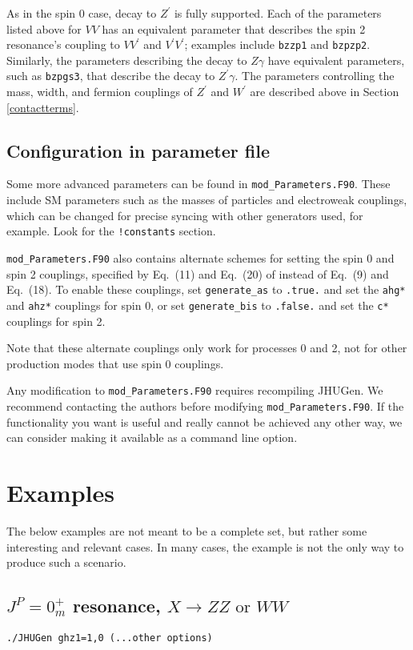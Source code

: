\documentclass[aps,superscriptaddress,nofootinbib]{revtex4}
\begin{document}
As in the spin 0 case, decay to $Z^\prime$ is fully supported.  Each of the parameters listed above for $VV$ has an equivalent parameter that describes the spin 2 resonance's coupling to $VV^\prime$ and $V^\prime V^\prime$; examples include \verb|bzzp1| and \verb|bzpzp2|.  Similarly, the parameters describing the decay to $Z\gamma$ have equivalent parameters, such as \verb|bzpgs3|, that describe the decay to $Z^\prime\gamma$.  The parameters controlling the mass, width, and fermion couplings of $Z^\prime$ and $W^\prime$ are described above in Section \ref{contactterms}.



\subsection{Configuration in parameter file}
Some more advanced parameters can be found in \verb|mod_Parameters.F90|.  These include SM parameters such as the masses of particles and electroweak couplings, which can be changed for precise syncing with other generators used, for example.  Look for the \verb|!constants| section.

\verb|mod_Parameters.F90| also contains alternate schemes for setting the spin 0 and spin 2 couplings, specified by Eq.~(11) and Eq.~(20) of \cite{Bolognesi:2012} instead of Eq.~(9) and Eq.~(18).  To enable these couplings, set \verb|generate_as| to \verb|.true.| and set the \verb|ahg*| and \verb|ahz*| couplings for spin 0, or set \verb|generate_bis| to \verb|.false.| and set the \verb|c*| couplings for spin 2.

Note that these alternate couplings only work for processes 0 and 2, not for other production modes that use spin 0 couplings.

Any modification to \verb|mod_Parameters.F90| requires recompiling JHUGen.  We recommend contacting the authors before modifying \verb|mod_Parameters.F90|.  If the functionality you want is useful and really cannot be achieved any other way, we can consider making it available as a command line option.

\section{Examples}
\noindent
The below examples are not meant to be a complete set, but rather some interesting and relevant cases.
In many cases, the example is not the only way to produce such a scenario.

\subsection{\texorpdfstring{$J^P = 0^+_m$ resonance, $X \to ZZ\text{ or }WW$}{JP=0+m resonance, X -> ZZ or WW}}
\label{sec:exA}
\begin{verbatim}
./JHUGen ghz1=1,0 (...other options)
\end{verbatim}
\end{document}
